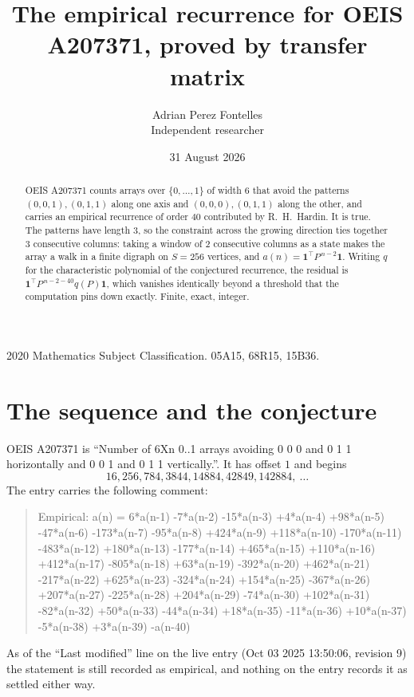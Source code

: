 \documentclass[11pt,a4paper]{article}
\title{The empirical recurrence for OEIS A207371, proved by transfer matrix}
\author{Adrian Perez Fontelles\\ \small Independent researcher}
\date{31 August 2026}
\theoremstyle{plain}
\theoremstyle{definition}
\begin{document}
\maketitle

\begin{abstract}
OEIS A207371 counts arrays over $\{0,\dots,1\}$ of width $6$ that avoid the patterns
$(0,0,1), (0,1,1)$ along one axis and $(0,0,0), (0,1,1)$ along the other, and carries an empirical recurrence of
order $40$ contributed by R.~H.~Hardin. It is true. The patterns have length $3$, so
the constraint across the growing direction ties together $3$ consecutive columns: taking a
window of $2$ consecutive columns as a state makes the array a walk in a finite digraph
on $S=256$ vertices, and $a(n)=\mathbf{1}^{\!\top}P^{\,n-2}\mathbf{1}$. Writing $q$
for the characteristic polynomial of the conjectured recurrence, the residual is
$\mathbf{1}^{\!\top}P^{\,n-2-40}q(P)\mathbf{1}$, which vanishes identically
beyond a threshold that the computation pins down exactly. Finite, exact, integer.
\end{abstract}

\noindent\small 2020 Mathematics Subject Classification. 05A15, 68R15, 15B36.\normalsize

\section{The sequence and the conjecture}

OEIS A207371 is ``Number of 6Xn 0..1 arrays avoiding 0 0 0 and 0 1 1 horizontally and 0 0 1 and 0 1 1 vertically.''. It has offset
$1$ and begins
\[
16, 256, 784, 3844, 14884, 42849, 142884,\ \dots
\]
The entry carries the following comment:
\begin{quote}\small
Empirical: a(n) = 6*a(n-1) -7*a(n-2) -15*a(n-3) +4*a(n-4) +98*a(n-5) -47*a(n-6) -173*a(n-7) -95*a(n-8) +424*a(n-9) +118*a(n-10) -170*a(n-11) -483*a(n-12) +180*a(n-13) -177*a(n-14) +465*a(n-15) +110*a(n-16) +412*a(n-17) -805*a(n-18) +63*a(n-19) -392*a(n-20) +462*a(n-21) -217*a(n-22) +625*a(n-23) -324*a(n-24) +154*a(n-25) -367*a(n-26) +207*a(n-27) -225*a(n-28) +204*a(n-29) -74*a(n-30) +102*a(n-31) -82*a(n-32) +50*a(n-33) -44*a(n-34) +18*a(n-35) -11*a(n-36) +10*a(n-37) -5*a(n-38) +3*a(n-39) -a(n-40)
\end{quote}
As of the ``Last modified'' line on the live entry (Oct 03 2025 13:50:06, revision
9) the statement is still recorded as empirical, and nothing on the entry
records it as settled either way.
\end{document}
